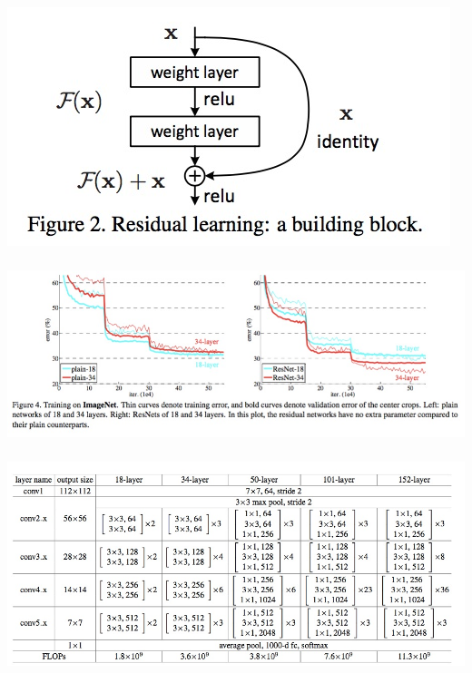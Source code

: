 \documentclass[xetex,mathserif,serif,aspectratio=169]{beamer}
\begin{document}
\begin{frame}[fragile] \frametitle{} \oldB \small

\begin{center}
\includegraphics[width=\textwidth]{img/resNetresidualUnit.jpg}
\end{center}

\end{frame}


\begin{frame}[fragile] \frametitle{} \oldB \small

\begin{center}
\includegraphics[width=\textwidth]{img/resNetPerform.jpg}
\end{center}

\end{frame}


\begin{frame}[fragile] \frametitle{} \oldB \small

\begin{center}
\includegraphics[width=\textwidth]{img/resNetModel.jpg}
\end{center}

\end{frame}
\end{document}
